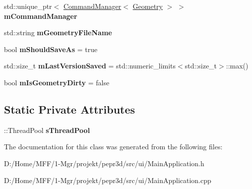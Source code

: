 \begin{DoxyCompactItemize}
\item 
\mbox{\label{classpepr3d_1_1_main_application_ad64561adc639db4aa6b8435a42b0d18e}} 
std\+::unique\+\_\+ptr$<$ \mbox{\hyperlink{classpepr3d_1_1_command_manager}{Command\+Manager}}$<$ \mbox{\hyperlink{classpepr3d_1_1_geometry}{Geometry}} $>$ $>$ {\bfseries m\+Command\+Manager}
\item 
\mbox{\label{classpepr3d_1_1_main_application_a86fa5e0f7cd52754e0b2d1cf0a15db35}} 
std\+::string {\bfseries m\+Geometry\+File\+Name}
\item 
\mbox{\label{classpepr3d_1_1_main_application_ac7cd61ba12de9b969d87c63388fb2c2a}} 
bool {\bfseries m\+Should\+Save\+As} = true
\item 
\mbox{\label{classpepr3d_1_1_main_application_aa071bb750bf3e9208764d64f6ab3cfed}} 
std\+::size\+\_\+t {\bfseries m\+Last\+Version\+Saved} = std\+::numeric\+\_\+limits$<$std\+::size\+\_\+t$>$\+::max()
\item 
\mbox{\label{classpepr3d_1_1_main_application_a2b9d7b9f1eda86cbaf509fd2be5bc5ab}} 
bool {\bfseries m\+Is\+Geometry\+Dirty} = false
\end{DoxyCompactItemize}
\subsection*{Static Private Attributes}
\begin{DoxyCompactItemize}
\item 
\mbox{\label{classpepr3d_1_1_main_application_a1171d4775a0e1cf5d00dd4995eff2262}} 
\+::Thread\+Pool {\bfseries s\+Thread\+Pool}
\end{DoxyCompactItemize}


The documentation for this class was generated from the following files\+:\begin{DoxyCompactItemize}
\item 
D\+:/\+Home/\+M\+F\+F/1-\/\+Mgr/projekt/pepr3d/src/ui/Main\+Application.\+h\item 
D\+:/\+Home/\+M\+F\+F/1-\/\+Mgr/projekt/pepr3d/src/ui/Main\+Application.\+cpp\end{DoxyCompactItemize}
